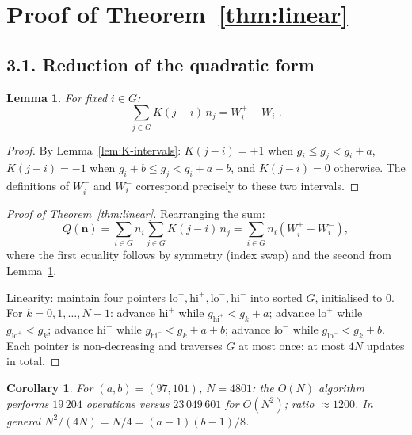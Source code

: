 \documentclass[11pt,a4paper]{amsart}
\theoremstyle{plain}
\newtheorem{lemma}[theorem]{Lemma}
\newtheorem{corollary}[theorem]{Corollary}
\theoremstyle{definition}
\theoremstyle{remark}
\begin{document}
\section{Proof of Theorem~\ref{thm:linear}}
\label{sec:proof-linear}

\subsection*{3.1. Reduction of the quadratic form}

\begin{lemma}
\label{lem:inner-sum}
For fixed $i \in G$:
\[
  \sum_{j \in G} K(j - i)\, n_j = W^+_i - W^-_i.
\]
\end{lemma}

\begin{proof}
By Lemma~\ref{lem:K-intervals}: $K(j - i) = +1$ when
$g_i \leq g_j < g_i + a$, $K(j-i) = -1$ when
$g_i + b \leq g_j < g_i + a + b$, and $K(j-i) = 0$ otherwise.
The definitions of $W^+_i$ and $W^-_i$ correspond precisely
to these two intervals.
\end{proof}

\begin{proof}[Proof of Theorem~\ref{thm:linear}]
Rearranging the sum:
\[
  Q(\mathbf{n}) = \sum_{i \in G} n_i \sum_{j \in G} K(j-i)\,n_j
  = \sum_{i \in G} n_i (W^+_i - W^-_i),
\]
where the first equality follows by symmetry (index swap)
and the second from Lemma~\ref{lem:inner-sum}.

Linearity: maintain four pointers
$\mathrm{lo}^+, \mathrm{hi}^+, \mathrm{lo}^-, \mathrm{hi}^-$
into sorted $G$, initialised to $0$.
For $k = 0, 1, \ldots, N-1$:
advance $\mathrm{hi}^+$ while $g_{\mathrm{hi}^+} < g_k + a$;
advance $\mathrm{lo}^+$ while $g_{\mathrm{lo}^+} < g_k$;
advance $\mathrm{hi}^-$ while $g_{\mathrm{hi}^-} < g_k + a + b$;
advance $\mathrm{lo}^-$ while $g_{\mathrm{lo}^-} < g_k + b$.
Each pointer is non-decreasing and traverses $G$ at most once:
at most $4N$ updates in total.
\end{proof}

\begin{corollary}
\label{cor:speedup}
For $(a, b) = (97, 101)$, $N = 4801$: the $O(N)$ algorithm performs
$19\,204$ operations versus $23\,049\,601$ for $O(N^2)$;
ratio $\approx 1200$.
In general $N^2 / (4N) = N/4 = (a-1)(b-1)/8$.
\end{corollary}

\end{document}
